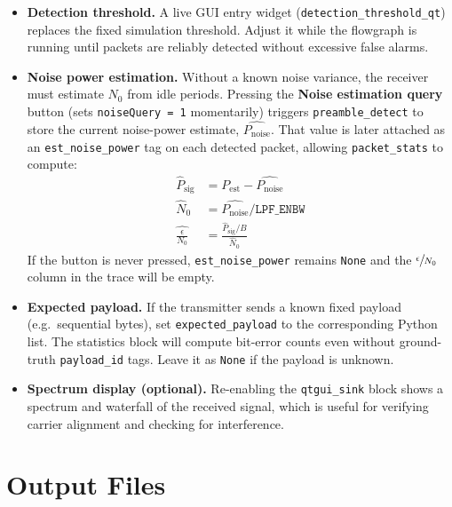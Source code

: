 \begin{itemize}
  \item \textbf{Detection threshold.}
    A live GUI entry widget (\texttt{detection\_threshold\_qt}) replaces the
    fixed simulation threshold. Adjust it while the flowgraph is running until
    packets are reliably detected without excessive false alarms.

  \item \textbf{Noise power estimation.}
    Without a known noise variance, the receiver must estimate $N_0$ from idle     periods. Pressing the \textbf{Noise estimation query} button (sets  \texttt{noiseQuery = 1} momentarily) triggers \texttt{preamble\_detect} to  store the current noise-power estimate, $\widehat{P_{\mathrm{noise}}}$. That value is later attached as an  \texttt{est\_noise\_power} tag on each detected packet, allowing
    \texttt{packet\_stats} to compute:
    \begin{align}
      \widehat{P}_{\mathrm{sig}} &= P_{\mathrm{est}} - \widehat{P_{\mathrm{noise}}} \\
      \widehat{N}_0 &= \widehat{P_{\mathrm{noise}}} / \mathtt{LPF\_ENBW} \\
      \widehat{\frac{\epsilon}{N_0}} &= \frac{\widehat{P}_{\mathrm{sig}} / B}{\widehat{N}_0}
    \end{align}
    If the button is never pressed, \texttt{est\_noise\_power} remains     \texttt{None} and the $\sfrac{\epsilon}{N_0}$ column in the trace will be empty.

  \item \textbf{Expected payload.}
    If the transmitter sends a known fixed payload (e.g.\ sequential bytes), set \texttt{expected\_payload} to the corresponding Python list. The statistics block will compute bit-error counts even without ground-truth \texttt{payload\_id} tags. Leave it as \texttt{None} if the payload is unknown.

  \item \textbf{Spectrum display (optional).}
    Re-enabling the \texttt{qtgui\_sink} block shows a spectrum and waterfall of the received signal, which is useful for verifying carrier alignment and checking for interference.
\end{itemize}


\section{Output Files}
\label{sec:output}

